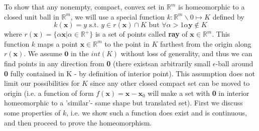 \documentclass{article}
\theoremstyle{definition}
\begin{document}
To show that any nonempty, compact, convex set in $\mathbb{R}^m$ is homeomorphic to a closed unit ball in $\mathbb{R}^m$, we will use a special function $k: \mathbb{R}^m\backslash 0 \mapsto K$ defined by $$k(\mathbf{x}) = y \text{ s.t. } y \in r(\mathbf{x})\cap K \text{ but } \forall \alpha>1 \alpha \mathbf{y} \notin K$$ where $r(\mathbf{x}) = \{\alpha\mathbf{x}\vert \alpha \in \mathbb{R}^+\}$ is a set of points called \textbf{ray} of $\mathbf{x}\in \mathbb{R}^m$. This function $k$ maps a point $\mathbf{x}\in \mathbb{R}^m$ to the point in $K$ farthest from the origin along $r(\mathbf{x})$. We assume $\mathbf{0}$ in the $int(K)$ without loss of generality, and thus we can find points in any direction from \textbf{0} (there existsan arbitrarily small $\epsilon$-ball around \textbf{0} fully contained in K - by definition of interior point). This assumption does not limit our possibilities for $K$ since any other closed compact set can be moved to origin (i.e. a function of form $f(\mathbf{x}) = \mathbf{x} - \mathbf{x}_0$ will make a set with \textbf{0} in interior homeomorphic to a 'similar'- same shape but translated set). First we discuss some properties of $k$, i.e. we show such a function does exist and is continuous, and then proceed to prove the homeomorphism. 
\end{document}
